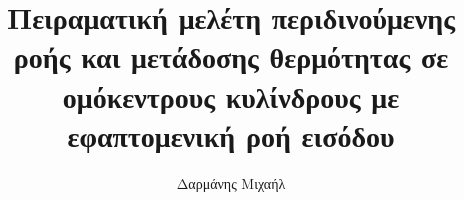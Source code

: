 \title{Πειραματική μελέτη περιδινούμενης ροής και μετάδοσης θερμότητας σε ομόκεντρους κυλίνδρους με εφαπτομενική
ροή εισόδου}


\author{Δαρμάνης Μιχαήλ}








     



\renewcommand{\submissiontext}{Η παρούσα εργασία υποβάλλεται προς έγκριση τίτλου}




\subject{LaTeX} 
